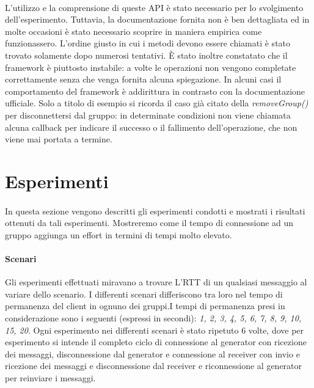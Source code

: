 \documentclass{llncs}
\begin{document}
\paragraph{} L'utilizzo e la comprensione di queste API è stato necessario per lo svolgimento dell'esperimento. Tuttavia, la documentazione fornita non è ben dettagliata ed in molte occasioni è stato necessario scoprire in maniera empirica come funzionassero. L'ordine giusto in cui i metodi devono essere chiamati è stato trovato solamente dopo numerosi tentativi.
È stato inoltre constatato che il framework è piuttosto instabile: a volte le operazioni non vengono completate correttamente senza che venga  fornita alcuna spiegazione. In alcuni casi il comportamento del framework è addirittura in contrasto con la documentazione ufficiale. Solo a titolo di esempio si ricorda il caso già citato della \emph{removeGroup()} per disconnettersi dal gruppo: in determinate condizioni non viene chiamata alcuna callback per indicare il successo o il fallimento dell'operazione, che non viene mai portata a termine.


\section{Esperimenti}
\paragraph{} In questa sezione vengono descritti gli esperimenti condotti e mostrati i risultati ottenuti da tali esperimenti. Mostreremo come il tempo di connessione ad un gruppo aggiunga un effort in termini di tempi molto elevato.
\paragraph{Scenari} Gli esperimenti effettuati miravano a trovare L'RTT di un qualsiasi messaggio al variare dello scenario. I differenti scenari differiscono tra loro nel tempo di permanenza del client in ognuno dei gruppi.I tempi di permanenza presi in considerazione sono i seguenti (espressi in secondi): \textit{1, 2, 3, 4, 5, 6, 7, 8, 9, 10, 15, 20}. Ogni esperimento nei differenti scenari è stato ripetuto 6 volte, dove per esperimento si intende il completo ciclo di connessione al generator con ricezione dei messaggi, disconnessione dal generator e connessione al receiver con invio e ricezione dei messaggi e disconnessione dal receiver e riconnessione al generator per reinviare i messaggi.
\end{document}
